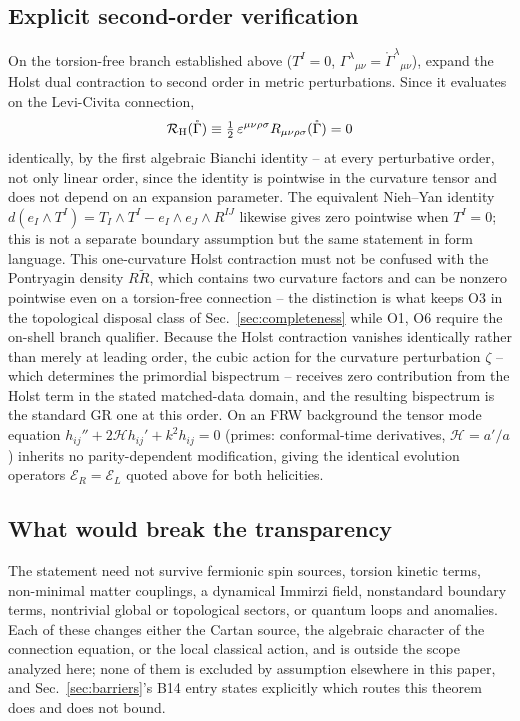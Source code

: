 \documentclass[aps,prd,twocolumn,superscriptaddress,preprintnumbers,nofootinbib,longbibliography,floatfix]{revtex4-2}
\begin{document}
\subsection{Explicit second-order verification}
On the torsion-free branch established above ($T^I=0$,
$\Gamma^\lambda{}_{\mu\nu}=\mathring\Gamma^\lambda{}_{\mu\nu}$), expand
the Holst dual contraction to second order in metric perturbations. Since
it evaluates on the Levi-Civita connection,
\begin{equation}
\mathcal R_{\rm H}(\mathring\Gamma)\equiv\tfrac12\,
\varepsilon^{\mu\nu\rho\sigma}R_{\mu\nu\rho\sigma}(\mathring\Gamma)=0
\end{equation}
identically, by the first algebraic Bianchi identity -- at every
perturbative order, not only linear order, since the identity is
pointwise in the curvature tensor and does not depend on an expansion
parameter. The equivalent Nieh--Yan identity
$d(e_I\wedge T^I)=T_I\wedge T^I-e_I\wedge e_J\wedge R^{IJ}$ likewise
gives zero pointwise when $T^I=0$; this is not a separate boundary
assumption but the same statement in form language. This one-curvature
Holst contraction must not be confused with the Pontryagin density
$R\widetilde R$, which contains two curvature factors and can be nonzero
pointwise even on a torsion-free connection -- the distinction is what
keeps O3 in the topological disposal class of
Sec.~\ref{sec:completeness} while O1, O6 require the on-shell branch
qualifier. Because the Holst contraction vanishes identically rather than
merely at leading order, the cubic action for the curvature perturbation
$\zeta$ -- which determines the primordial bispectrum -- receives zero
contribution from the Holst term in the stated matched-data domain, and
the resulting bispectrum is the standard GR one at this order. On an FRW
background the tensor mode equation
$h_{ij}''+2\mathcal H h_{ij}'+k^2h_{ij}=0$ (primes: conformal-time
derivatives, $\mathcal H=a'/a$) inherits no parity-dependent
modification, giving the identical evolution operators
$\mathcal E_R=\mathcal E_L$ quoted above for both helicities.

\subsection{What would break the transparency}
The statement need not survive fermionic spin sources, torsion kinetic
terms, non-minimal matter couplings, a dynamical Immirzi field,
nonstandard boundary terms, nontrivial global or topological sectors, or
quantum loops and anomalies. Each of these changes either the Cartan
source, the algebraic character of the connection equation, or the local
classical action, and is outside the scope analyzed here; none of them
is excluded by assumption elsewhere in this paper, and Sec.~\ref{sec:barriers}'s
B14 entry states explicitly which routes this theorem does and does not
bound.
\end{document}
